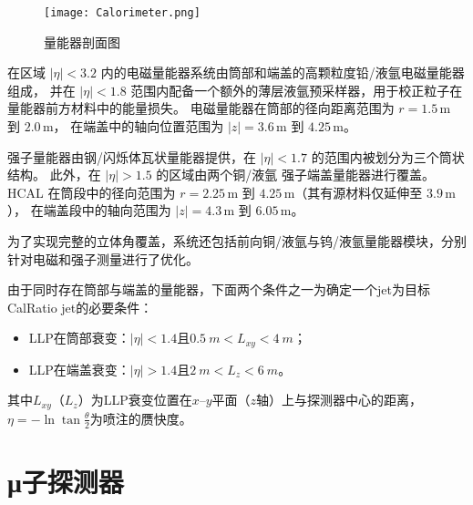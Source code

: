 \begin{figure}[ht]
    \centering
    \texttt{[image: Calorimeter.png]}
    \caption{量能器剖面图}
    \label{fig:Calorimeter}
\end{figure}

在区域 \( |\eta| < 3.2 \) 内的电磁量能器系统由筒部和端盖的高颗粒度铅/液氩电磁量能器组成，
并在 \( |\eta| < 1.8 \) 范围内配备一个额外的薄层液氩预采样器，用于校正粒子在量能器前方材料中的能量损失。
电磁量能器在筒部的径向距离范围为 \( r = 1.5\,\text{m} \) 到 \( 2.0\,\text{m} \)，
在端盖中的轴向位置范围为 \( |z| = 3.6\,\text{m} \) 到 \( 4.25\,\text{m} \)。

强子量能器由钢/闪烁体瓦状量能器提供，在 \( |\eta| < 1.7 \) 的范围内被划分为三个筒状结构。
此外，在 \( |\eta| > 1.5 \) 的区域由两个铜/液氩 强子端盖量能器进行覆盖。
HCAL 在筒段中的径向范围为 \( r = 2.25\,\text{m} \) 到 \( 4.25\,\text{m} \)（其有源材料仅延伸至 \( 3.9\,\text{m} \)），
在端盖段中的轴向范围为 \( |z| = 4.3\,\text{m} \) 到 \( 6.05\,\text{m} \)。

为了实现完整的立体角覆盖，系统还包括前向铜/液氩与钨/液氩量能器模块，分别针对电磁和强子测量进行了优化。


由于同时存在筒部与端盖的量能器，下面两个条件之一为确定一个jet为目标CalRatio jet的必要条件：
\begin{itemize}
    \item LLP在筒部衰变：$|\eta|<1.4$且$\SI{0.5}{m}<L_{xy}<\SI{4}{m}$；
    \item LLP在端盖衰变：$|\eta|>1.4$且$\SI{2}{m}<L_{z}<\SI{6}{m}$。
\end{itemize}
其中$L_{xy}$（$L_{z}$）为LLP衰变位置在$x$--$y$平面（$z$轴）上与探测器中心的距离，
$\eta=-\ln \tan \frac{\theta}{2}$为喷注的赝快度。

\section{μ子探测器}
